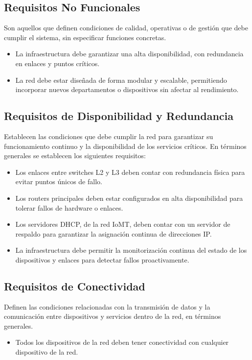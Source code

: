 \subsection{Requisitos No Funcionales}
Son aquellos que definen condiciones de calidad, operativas o de gestión que debe cumplir el sistema, sin especificar funciones concretas.
\begin{itemize}
    \item La infraestructura debe garantizar una alta disponibilidad, con redundancia en enlaces y puntos críticos.
    \item La red debe estar diseñada de forma modular y escalable, permitiendo incorporar nuevos departamentos o dispositivos sin afectar al rendimiento.
\end{itemize}
\subsection{Requisitos de Disponibilidad y Redundancia}
Establecen las condiciones que debe cumplir la red para garantizar su funcionamiento continuo y la disponibilidad de los servicios críticos. En términos generales se establecen los siguientes requisitos:
\begin{itemize}
    \item Los enlaces entre switches L2 y L3 deben contar con redundancia física para evitar puntos únicos de fallo.
    \item Los routers principales deben estar configurados en alta disponibilidad para tolerar fallos de hardware o enlaces.
    \item Los servidores DHCP, de la red IoMT, deben contar con un servidor de respaldo para garantizar la asignación continua de direcciones IP.
    \item La infraestructura debe permitir la monitorización continua del estado de los dispositivos y enlaces para detectar fallos proactivamente.
\end{itemize}

\subsection{Requisitos de Conectividad}
Definen las condiciones relacionadas con la transmisión de datos y la comunicación entre dispositivos y servicios dentro de la red, en términos generales.
\begin{itemize}
    \item Todos los dispositivos de la red deben tener conectividad con cualquier dispositivo de la red.
\end{itemize}

